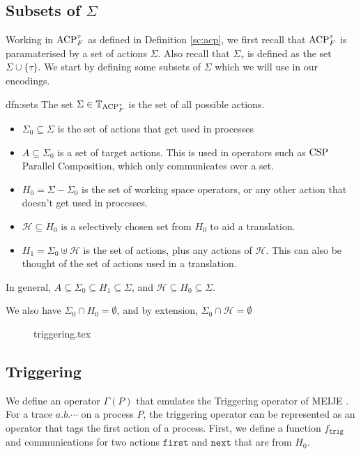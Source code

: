 \documentclass[../hons_project.tex]{subfiles}
\begin{document}
\subsection{Subsets of \texorpdfstring{$\Sigma$}{Sigma}}
Working in $\mathrm{ACP}_{F}^{\tau}$ as defined in Definition \ref{sc:acp}, we first recall that $\mathrm{ACP}_{F}^{\tau}$ is paramaterised by a set of actions $\Sigma$. Also recall that $\Sigma_{\tau}$ is defined as the set $\Sigma \cup \{\tau\}$. We start by defining some subsets of $\Sigma$ which we will use in our encodings.

\begin{dfn}[Subsets of A]{dfn:sets}{}
	The set $\Sigma\in \mathbb{T}_{\mathrm{ACP}_{F}^{\tau}}$ is the set of all possible actions.
	\begin{itemize}
		\item $\Sigma_{0} \subseteq \Sigma$ is the set of actions that get used in processes
		\item $A \subseteq \Sigma_{0}$ is a set of target actions. This is used in operators such as $\mathrm{CSP}$ Parallel Composition, which only communicates over a set.
		\item $H_{0} = \Sigma - \Sigma_{0}$ is the set of working space operators, or any other action that doesn't get used in processes.
		\item $\mathscr{H} \subseteq H_{0}$ is a selectively chosen set from $H_{0}$ to aid a translation.
		\item $H_{1} = \Sigma_{0} \uplus \mathscr{H}$ is the set of actions, plus any actions of $\mathscr{H}$. This can also be thought of the set of actions used in a translation.
	\end{itemize}

	In general, $A \subseteq \Sigma_{0} \subseteq H_{1} \subseteq \Sigma$, and $\mathscr{H} \subseteq H_{0} \subseteq \Sigma$.

	We also have $\Sigma_{0} \cap H_{0} = \emptyset$, and by extension, $\Sigma_{0} \cap \mathscr{H} = \emptyset$
\end{dfn}


\begin{figure}[!ht]
	\centering
	{triggering.tex}
\end{figure}
\subsection{Triggering}\label{ssec:triggering}
We define an operator $\Gamma(P)$ that emulates the Triggering operator of MEIJE \cite{austryAlgebreProcessusSynchronisation1984, desimoneHigherlevelSynchronisingDevices1985}. For a trace $a.b.\cdots$ on a process $P$, the triggering operator can be represented as an operator that tags the first action of a process.
First, we define a function $f_{\mathtt{trig}}$ and communications for two actions $\mathtt{first}$ and $\mathtt{next}$ that are from $H_{0}$.
\end{document}
